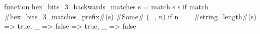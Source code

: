 function hex_bits_3_backwards_matches s = match s {
  s if match #\hyperref[sailRISCVzhexzybitszy3zymatcheszyprefix]{hex\_bits\_3\_matches\_prefix}#(s) {
    #\hyperref[sailRISCVzSome]{Some}# (_, n) if n == #\hyperref[sailRISCVzstringzylength]{string\_length}#(s) => true,
    _ => false
  } => true,
  _ => false
}
